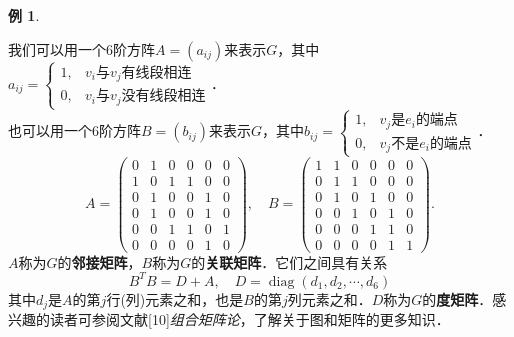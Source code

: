 \documentclass[a4paper,fontset=windows]{ctexbook}
\theoremstyle{definition}
\newtheorem{example}{例}[chapter]
\DeclareMathOperator{\diag}{diag}
\begin{document}
\begin{example}
\begin{itemize}
我们可以用一个6阶方阵$A=(a_{ij})$来表示$G$，其中$a_{ij}=\begin{cases}1,&\text{$v_i$与$v_j$有线段相连} \\ 0,&\text{$v_i$与$v_j$没有线段相连}\end{cases}$．\\ 也可以用一个6阶方阵$B=(b_{ij})$来表示$G$，其中$b_{ij}=\begin{cases}1,&\text{$v_j$是$e_i$的端点} \\ 0,&\text{$v_j$不是$e_i$的端点}\end{cases}$．
$$A=\begin{pmatrix}0&1&0&0&0&0 \\ 1&0&1&1&0&0 \\ 0&1&0&0&1&0 \\ 0&1&0&0&1&0 \\ 0&0&1&1&0&1 \\  0&0&0&0&1&0\end{pmatrix},\quad B=\begin{pmatrix}1&1&0&0&0&0 \\ 0&1&1&0&0&0 \\ 0&1&0&1&0&0 \\ 0&0&1&0&1&0 \\ 0&0&0&1&1&0 \\  0&0&0&0&1&1\end{pmatrix}.$$
$A$称为$G$的{\bf 邻接矩阵}，$B$称为$G$的{\bf 关联矩阵}．它们之间具有关系
$$B^TB=D+A,\quad D=\diag(d_1,d_2,\cdots,d_6)$$
其中$d_j$是$A$的第$j$行(列)元素之和，也是$B$的第$j$列元素之和．$D$称为$G$的{\bf 度矩阵}．感兴趣的读者可参阅文献[10]{\em 组合矩阵论}，了解关于图和矩阵的更多知识．


\end{itemize}
\end{example}
\end{document}
